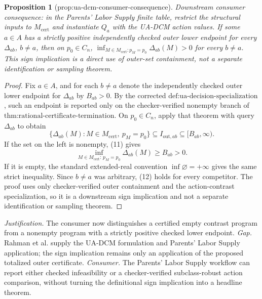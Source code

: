 \documentclass{article}
\newtheorem{proposition}{Proposition}
\begin{document}
\begin{proposition}[prop:ua-dcm-consumer-consequence]\label{prop:ua-dcm-consumer-consequence}
Downstream consumer consequence: in the Parents' Labor Supply finite table, restrict the structural inputs to \(M_{\mathrm{cert}}\) and instantiate \(Q_a\) with the UA-DCM action values. If some \(a\in A\) has a strictly positive independently checked outer lower endpoint for every \(\Delta_{ab}\), \(b\ne a\), then on \(p_0\in C_n\), \(\inf_{M\in M_{\mathrm{cert}}:p_M=p_0}\Delta_{ab}(M)>0\) for every \(b\ne a\). This sign implication is a direct use of outer-set containment, not a separate identification or sampling theorem.
\end{proposition}
\begin{proof}
Fix \(a\in A\), and for each \(b\ne a\) denote the independently checked outer lower endpoint for \(\Delta_{ab}\) by \(B_{ab}>0\).  By the corrected \(\text{def:ua-decision-specialization}\), such an endpoint is reported only on the checker-verified nonempty branch of \(\text{thm:rational-certificate-termination}\).  On \(p_0\in C_n\), apply that theorem with query \(\Delta_{ab}\) to obtain
\[
\{\Delta_{ab}(M):M\in M_{\mathrm{cert}},\ p_M=p_0\}
\subseteq I_{\mathrm{out},ab}\subseteq[B_{ab},\infty). \tag{11}
\]
If the set on the left is nonempty, (11) gives
\[
\inf_{M\in M_{\mathrm{cert}}:\,p_M=p_0}\Delta_{ab}(M)
\geq B_{ab}>0. \tag{12}
\]
If it is empty, the standard extended-real convention \(\inf\varnothing=+\infty\) gives the same strict inequality.  Since \(b\ne a\) was arbitrary, (12) holds for every competitor.  The proof uses only checker-verified outer containment and the action-contrast specialization, so it is a downstream sign implication and not a separate identification or sampling theorem.
\end{proof}
\par\smallskip\noindent \textit{Justification.} The consumer now distinguishes a certified empty contrast program from a nonempty program with a strictly positive checked lower endpoint. \textit{Gap.} Rahman et al. supply the UA-DCM formulation and Parents' Labor Supply application; the sign implication remains only an application of the proposed totalized outer certificate. \textit{Consumer.} The Parents' Labor Supply workflow can report either checked infeasibility or a checker-verified subclass-robust action comparison, without turning the definitional sign implication into a headline theorem.
\end{document}
